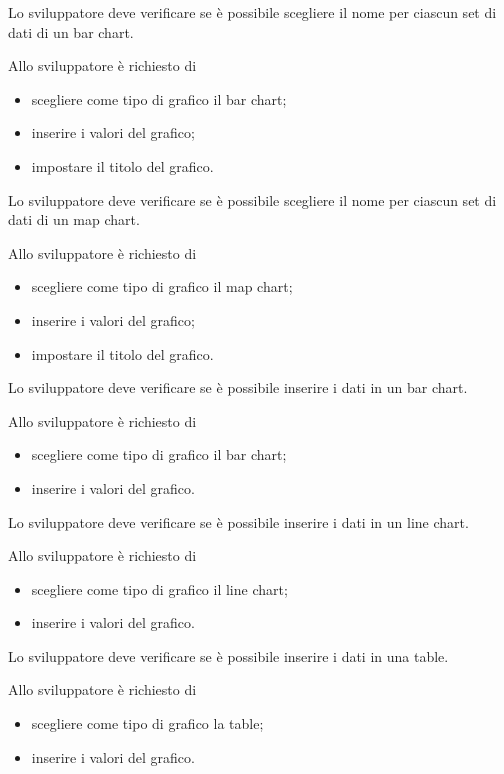 	Lo sviluppatore deve verificare se è possibile scegliere il nome per ciascun set di dati di un bar chart.

		Allo sviluppatore è richiesto di
		\begin{itemize}
			\item scegliere come tipo di grafico il bar chart;
			\item inserire i valori del grafico;
			\item impostare il titolo del grafico.
		\end{itemize}

	Lo sviluppatore deve verificare se è possibile scegliere il nome per ciascun set di dati di un map chart.

		Allo sviluppatore è richiesto di
		\begin{itemize}
			\item scegliere come tipo di grafico il map chart;
			\item inserire i valori del grafico;
			\item impostare il titolo del grafico.
		\end{itemize}

	Lo sviluppatore deve verificare se è possibile inserire i dati in un bar chart.

		Allo sviluppatore è richiesto di
		\begin{itemize}
			\item scegliere come tipo di grafico il bar chart;
			\item inserire i valori del grafico.
		\end{itemize}	
			
	Lo sviluppatore deve verificare se è possibile inserire i dati in un line chart.

		Allo sviluppatore è richiesto di
		\begin{itemize}
			\item scegliere come tipo di grafico il line chart;
			\item inserire i valori del grafico.
		\end{itemize}	

	Lo sviluppatore deve verificare se è possibile inserire i dati in una table.

		Allo sviluppatore è richiesto di
		\begin{itemize}
			\item scegliere come tipo di grafico la table;
			\item inserire i valori del grafico.
		\end{itemize}	


